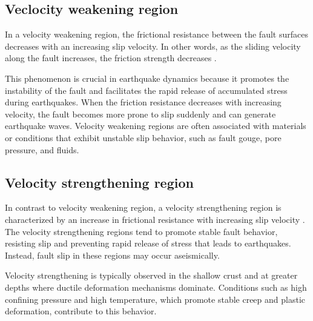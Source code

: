 \subsection{Veclocity weakening region}
In a velocity weakening region, the frictional resistance between the fault surfaces decreases with an increasing slip velocity.
In other words, as the sliding velocity along the fault increases, the friction strength decreases \citep{10.1785/BSSA0880061466}.

This phenomenon is crucial in earthquake dynamics because it promotes the instability of the fault and facilitates the rapid release of accumulated stress during earthquakes.
When the friction resistance decreases with increasing velocity, the fault becomes more prone to slip suddenly and can generate earthquake waves.
Velocity weakening regions are often associated with materials or conditions that exhibit unstable slip behavior, such as fault gouge, pore pressure, and fluids.

\subsection{Velocity strengthening region}
In contrast to velocity weakening region, a velocity strengthening region is characterized by an increase in frictional resistance with increasing slip velocity \citep{perfettini2008dynamics}.
The velocity strengthening regions tend to promote stable fault behavior, resisting slip and preventing rapid release of stress that leads to earthquakes.
Instead, fault slip in these regions may occur aseismically.

Velocity strengthening is typically observed in the shallow crust and at greater depths where ductile deformation mechanisms dominate. 
Conditions such as high confining pressure and high temperature, which promote stable creep and plastic deformation, contribute to this behavior.

